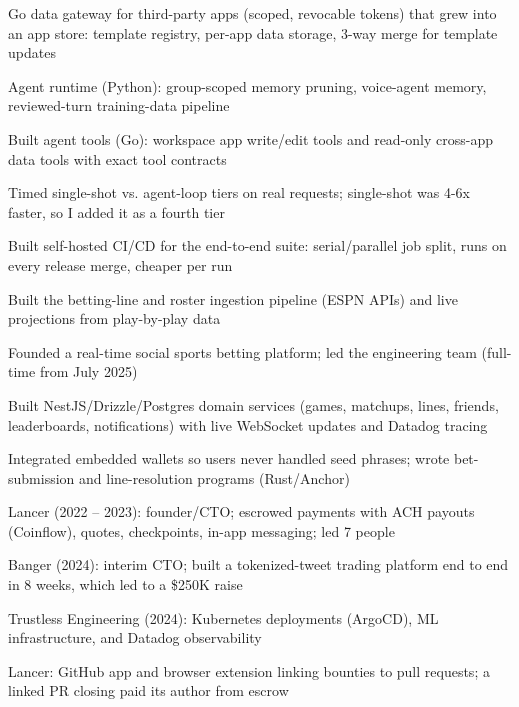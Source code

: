 \documentclass[print]{jack-resume}
\begin{document}
\begin{tightemize}
    \item Go data gateway for third-party apps (scoped, revocable tokens) that grew into an app store: template registry, per-app data storage, 3-way merge for template updates
    \item Agent runtime (Python): group-scoped memory pruning, voice-agent memory, reviewed-turn training-data pipeline
    \item Built agent tools (Go): workspace app write/edit tools and read-only cross-app data tools with exact tool contracts
    \item Timed single-shot vs. agent-loop tiers on real requests; single-shot was 4-6x faster, so I added it as a fourth tier
    \item Built self-hosted CI/CD for the end-to-end suite: serial/parallel job split, runs on every release merge, cheaper per run
\end{tightemize}
\sectionsep

\begin{tightemize}
    \item Built the betting-line and roster ingestion pipeline (ESPN APIs) and live projections from play-by-play data
    \item Founded a real-time social sports betting platform; led the engineering team (full-time from July 2025)
    \item Built NestJS/Drizzle/Postgres domain services (games, matchups, lines, friends, leaderboards, notifications) with live WebSocket updates and Datadog tracing
    \item Integrated embedded wallets so users never handled seed phrases; wrote bet-submission and line-resolution programs (Rust/Anchor)
\end{tightemize}
\sectionsep

\begin{tightemize}
    \item Lancer (2022 -- 2023): founder/CTO; escrowed payments with ACH payouts (Coinflow), quotes, checkpoints, in-app messaging; led 7 people
    \item Banger (2024): interim CTO; built a tokenized-tweet trading platform end to end in 8 weeks, which led to a \$250K raise
    \item Trustless Engineering (2024): Kubernetes deployments (ArgoCD), ML infrastructure, and Datadog observability
    \item Lancer: GitHub app and browser extension linking bounties to pull requests; a linked PR closing paid its author from escrow
\end{tightemize}
\sectionsep
\end{document}
